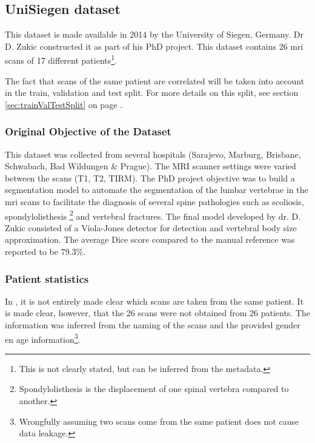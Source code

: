 

\subsection{UniSiegen dataset\label{sec:DataUSiegen}}

This dataset is made available in 2014 by the University of Siegen, Germany.
Dr D. Zukic \cite{Zukic2014} constructed it as part of his PhD project.
This dataset contains 26 \acrshort{mri} scans of 17 different patients\footnote{This is not clearly stated, but can be inferred from the metadata.}. 

The fact that scans of the same patient are correlated will be taken into account in the train, validation and test split.
For more details on this split, see section \ref{sec:trainValTestSplit} on page \pageref{sec:trainValTestSplit}.


\subsubsection{Original Objective of the Dataset}

This dataset was collected from several hospitals (Sarajevo, Marburg, Brisbane, Schwabach, Bad Wildungen \& Prague). The MRI scanner settings were varied between the scans (T1, T2, TIRM).
The PhD project objective was to build a segmentation model to automate the segmentation of the lumbar vertebrae in the \acrshort{mri} scans to facilitate the diagnosis of several spine pathologies 
such as scoliosis, spondylolisthesis \footnote{Spondylolisthesis is the displacement of one spinal vertebra compared to another.} and vertebral fractures.
The final model developed by dr. D. Zukic consisted of a Viola-Jones detector for detection and vertebral body size approximation.
The average Dice score compared to the manual reference was reported to be 79.3\%.

\subsubsection{Patient statistics}
In \cite{Zukic2014}, it is not entirely made clear which scans are taken from the same patient.
It is made clear, however, that the 26 scans were not obtained from 26 patients.
The information was inferred from the naming of the scans and the provided gender en age information\footnote{
    Wrongfully assuming two scans come from the same patient does not cause data leakage.
}.

